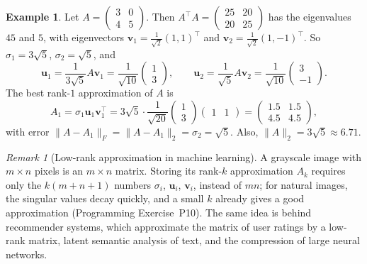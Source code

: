 \documentclass[11pt]{article}
\newcommand{\norm}[1]{\lVert #1 \rVert}
\theoremstyle{definition}
\newtheorem{example}[definition]{Example}
\theoremstyle{plain}
\theoremstyle{remark}
\newtheorem{remark}[definition]{Remark}
\begin{document}
\begin{example}\label{ex:low-rank}
    Let $A = \begin{pmatrix} 3 & 0 \\ 4 & 5 \end{pmatrix}$. Then $A^\top A = \begin{pmatrix} 25 & 20 \\ 20 & 25 \end{pmatrix}$ has the eigenvalues $45$ and $5$, with eigenvectors $\mathbf{v}_1 = \frac{1}{\sqrt{2}}(1, 1)^\top$ and $\mathbf{v}_2 = \frac{1}{\sqrt{2}}(1, -1)^\top$. So $\sigma_1 = 3\sqrt{5}$, $\sigma_2 = \sqrt{5}$, and
    \[\mathbf{u}_1 = \frac{1}{3\sqrt{5}} A \mathbf{v}_1 = \frac{1}{\sqrt{10}} \begin{pmatrix} 1 \\ 3 \end{pmatrix}, \qquad \mathbf{u}_2 = \frac{1}{\sqrt{5}} A \mathbf{v}_2 = \frac{1}{\sqrt{10}} \begin{pmatrix} 3 \\ -1 \end{pmatrix}.\]
    The best rank-$1$ approximation of $A$ is
    \[A_1 = \sigma_1 \mathbf{u}_1 \mathbf{v}_1^\top = 3\sqrt{5} \cdot \frac{1}{\sqrt{20}} \begin{pmatrix} 1 \\ 3 \end{pmatrix} \begin{pmatrix} 1 & 1 \end{pmatrix} = \begin{pmatrix} 1.5 & 1.5 \\ 4.5 & 4.5 \end{pmatrix},\]
    with error $\norm{A - A_1}_F = \norm{A - A_1}_2 = \sigma_2 = \sqrt{5}$. Also, $\norm{A}_2 = 3\sqrt{5} \approx 6.71$.
\end{example}

\begin{remark}[Low-rank approximation in machine learning]
    A grayscale image with $m \times n$ pixels is an $m \times n$ matrix. Storing its rank-$k$ approximation $A_k$ requires only the $k(m + n + 1)$ numbers $\sigma_i$, $\mathbf{u}_i$, $\mathbf{v}_i$, instead of $mn$; for natural images, the singular values decay quickly, and a small $k$ already gives a good approximation (Programming Exercise~P10). The same idea is behind recommender systems, which approximate the matrix of user ratings by a low-rank matrix, latent semantic analysis of text, and the compression of large neural networks.
\end{remark}
\end{document}
